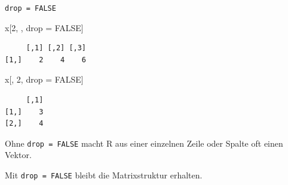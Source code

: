 \documentclass[
  10pt,
  ignorenonframetext,
  aspectratio=169,
]{beamer}
\newenvironment{Shaded}{}{}
\newcommand{\ConstantTok}[1]{\textcolor[rgb]{0.53,0.00,0.00}{#1}}
\newcommand{\DecValTok}[1]{\textcolor[rgb]{0.25,0.63,0.44}{#1}}
\newcommand{\NormalTok}[1]{#1}
\newcommand{\OtherTok}[1]{\textcolor[rgb]{0.00,0.44,0.13}{#1}}
\begin{document}
\begin{frame}[fragile]{\texttt{drop\ =\ FALSE}}
\label{drop-false}
\begin{Shaded}
\begin{Highlighting}[]
\NormalTok{x[}\DecValTok{2}\NormalTok{, , drop }\OtherTok{=} \ConstantTok{FALSE}\NormalTok{]}
\end{Highlighting}
\end{Shaded}

\begin{verbatim}
     [,1] [,2] [,3]
[1,]    2    4    6
\end{verbatim}

\begin{Shaded}
\begin{Highlighting}[]
\NormalTok{x[, }\DecValTok{2}\NormalTok{, drop }\OtherTok{=} \ConstantTok{FALSE}\NormalTok{]}
\end{Highlighting}
\end{Shaded}

\begin{verbatim}
     [,1]
[1,]    3
[2,]    4
\end{verbatim}

Ohne \texttt{drop\ =\ FALSE} macht R aus einer einzelnen Zeile oder
Spalte oft einen Vektor.

Mit \texttt{drop\ =\ FALSE} bleibt die Matrixstruktur erhalten.
\end{frame}
\end{document}
